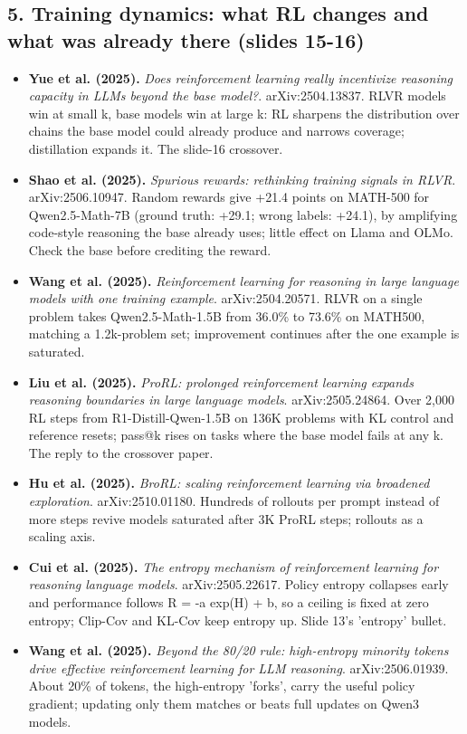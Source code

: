 \documentclass[11pt,letterpaper]{article}
\begin{document}
\subsection*{5. Training dynamics: what RL changes and what was already there (slides 15-16)}
\begin{itemize}[leftmargin=1.2em,itemsep=3pt]\sloppy
\item \textbf{Yue et al. (2025).} \textit{Does reinforcement learning really incentivize reasoning capacity in LLMs beyond the base model?}. arXiv:2504.13837. RLVR models win at small k, base models win at large k: RL sharpens the distribution over chains the base model could already produce and narrows coverage; distillation expands it. The slide-16 crossover.
\item \textbf{Shao et al. (2025).} \textit{Spurious rewards: rethinking training signals in RLVR}. arXiv:2506.10947. Random rewards give +21.4 points on MATH-500 for Qwen2.5-Math-7B (ground truth: +29.1; wrong labels: +24.1), by amplifying code-style reasoning the base already uses; little effect on Llama and OLMo. Check the base before crediting the reward.
\item \textbf{Wang et al. (2025).} \textit{Reinforcement learning for reasoning in large language models with one training example}. arXiv:2504.20571. RLVR on a single problem takes Qwen2.5-Math-1.5B from 36.0\% to 73.6\% on MATH500, matching a 1.2k-problem set; improvement continues after the one example is saturated.
\item \textbf{Liu et al. (2025).} \textit{ProRL: prolonged reinforcement learning expands reasoning boundaries in large language models}. arXiv:2505.24864. Over 2,000 RL steps from R1-Distill-Qwen-1.5B on 136K problems with KL control and reference resets; pass@k rises on tasks where the base model fails at any k. The reply to the crossover paper.
\item \textbf{Hu et al. (2025).} \textit{BroRL: scaling reinforcement learning via broadened exploration}. arXiv:2510.01180. Hundreds of rollouts per prompt instead of more steps revive models saturated after 3K ProRL steps; rollouts as a scaling axis.
\item \textbf{Cui et al. (2025).} \textit{The entropy mechanism of reinforcement learning for reasoning language models}. arXiv:2505.22617. Policy entropy collapses early and performance follows R = -a exp(H) + b, so a ceiling is fixed at zero entropy; Clip-Cov and KL-Cov keep entropy up. Slide 13's 'entropy' bullet.
\item \textbf{Wang et al. (2025).} \textit{Beyond the 80/20 rule: high-entropy minority tokens drive effective reinforcement learning for LLM reasoning}. arXiv:2506.01939. About 20\% of tokens, the high-entropy 'forks', carry the useful policy gradient; updating only them matches or beats full updates on Qwen3 models.

\end{itemize}
\end{document}
